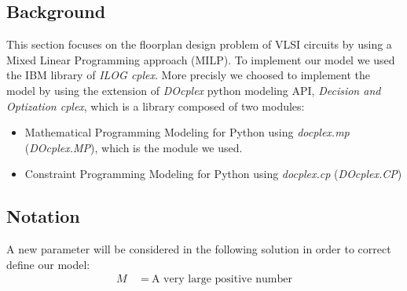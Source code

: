 \subsection{Background}
    This section focuses on the floorplan design problem of VLSI circuits by using a Mixed Linear
    Programming approach (MILP). To implement our model we used the IBM library of 
    \textit{ILOG cplex}. More precisly we choosed to implement the model by using the extension of
    \textit{DOcplex} python modeling API, \textit{Decision and Optization cplex}, which is a 
    library composed of two modules:
    \begin{itemize}
        \item Mathematical Programming Modeling for Python using \textit{docplex.mp}
              (\textit{DOcplex.MP}), which is the module we used.
        \item Constraint Programming Modeling for Python using \textit{docplex.cp} (\textit{DOcplex.CP})
    \end{itemize}

\subsection{Notation}
    A new parameter will be considered in the following solution in order to correct define our model:
    \begin{align*}
        M\        &\ =\ \text{A very large positive number}
    \end{align*}

